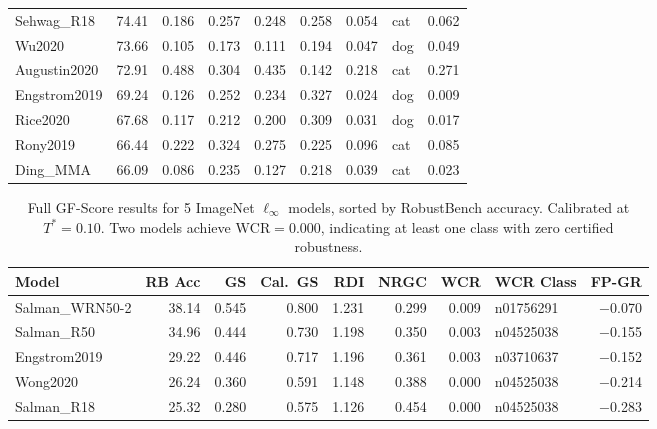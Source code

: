 \begin{table}[H]
\begin{tabular}{@{}lrrrrrrlr@{}}
        Sehwag\_R18        & 74.41 & 0.186 & 0.257 & 0.248 & 0.258 & 0.054 & cat & 0.062 \\
        Wu2020             & 73.66 & 0.105 & 0.173 & 0.111 & 0.194 & 0.047 & dog & 0.049 \\
        Augustin2020       & 72.91 & 0.488 & 0.304 & 0.435 & 0.142 & 0.218 & cat & 0.271 \\
        Engstrom2019       & 69.24 & 0.126 & 0.252 & 0.234 & 0.327 & 0.024 & dog & 0.009 \\
        Rice2020           & 67.68 & 0.117 & 0.212 & 0.200 & 0.309 & 0.031 & dog & 0.017 \\
        Rony2019           & 66.44 & 0.222 & 0.324 & 0.275 & 0.225 & 0.096 & cat & 0.085 \\
        Ding\_MMA          & 66.09 & 0.086 & 0.235 & 0.127 & 0.218 & 0.039 & cat & 0.023 \\
        \bottomrule
    \end{tabular}
\end{table}

\begin{table}[H]
    \caption{Full GF-Score results for 5 ImageNet $\ell_\infty$ models, sorted by RobustBench accuracy. Calibrated at $T^* = 0.10$. Two models achieve $\mathrm{WCR} = 0.000$, indicating at least one class with zero certified robustness.}
    \label{tab:imagenet_full}
    \centering
    \small
    \begin{tabular}{@{}lrrrrrrlr@{}}
        \toprule
        \textbf{Model} & \textbf{RB Acc} & \textbf{GS} & \textbf{Cal.\ GS} & \textbf{RDI} & \textbf{NRGC} & \textbf{WCR} & \textbf{WCR Class} & \textbf{FP-GR} \\
        \midrule
        Salman\_WRN50-2 & 38.14 & 0.545 & 0.800 & 1.231 & 0.299 & 0.009 & n01756291 & $-$0.070 \\
        Salman\_R50     & 34.96 & 0.444 & 0.730 & 1.198 & 0.350 & 0.003 & n04525038 & $-$0.155 \\
        Engstrom2019    & 29.22 & 0.446 & 0.717 & 1.196 & 0.361 & 0.003 & n03710637 & $-$0.152 \\
        Wong2020        & 26.24 & 0.360 & 0.591 & 1.148 & 0.388 & 0.000 & n04525038 & $-$0.214 \\
        Salman\_R18     & 25.32 & 0.280 & 0.575 & 1.126 & 0.454 & 0.000 & n04525038 & $-$0.283 \\
        \bottomrule
    \end{tabular}
\end{table}

